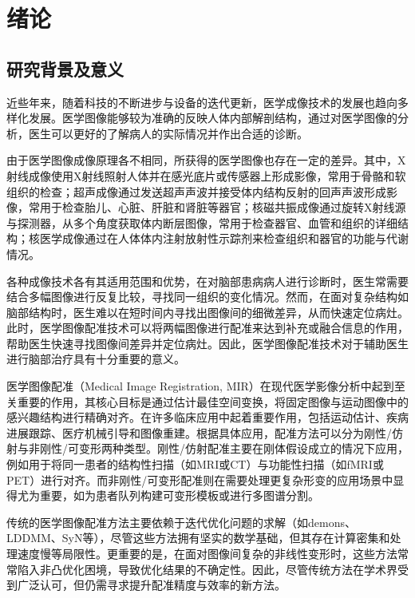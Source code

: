\chapter{绪\quad 论}

\section{研究背景及意义}

近些年来，随着科技的不断进步与设备的迭代更新，医学成像技术的发展也趋向多样化发展。医学图像能够较为准确的反映人体内部解剖结构，通过对医学图像的分析，医生可以更好的了解病人的实际情况并作出合适的诊断。

由于医学图像成像原理各不相同，所获得的医学图像也存在一定的差异。其中，X射线成像使用X射线照射人体并在感光底片或传感器上形成影像，常用于骨骼和软组织的检查；超声成像通过发送超声声波并接受体内结构反射的回声声波形成影像，常用于检查胎儿、心脏、肝脏和肾脏等器官；核磁共振成像通过旋转X射线源与探测器，从多个角度获取体内断层图像，常用于检查器官、血管和组织的详细结构；核医学成像通过在人体体内注射放射性示踪剂来检查组织和器官的功能与代谢情况。

各种成像技术各有其适用范围和优势，在对脑部患病病人进行诊断时，医生常需要结合多幅图像进行反复比较，寻找同一组织的变化情况。然而，在面对复杂结构如脑部结构时，医生难以在短时间内寻找出图像间的细微差异，从而快速定位病灶。此时，医学图像配准技术可以将两幅图像进行配准来达到补充或融合信息的作用，帮助医生快速寻找图像间差异并定位病灶。因此，医学图像配准技术对于辅助医生进行脑部治疗具有十分重要的意义。

医学图像配准（Medical Image Registration, MIR）在现代医学影像分析中起到至关重要的作用，其核心目标是通过估计最佳空间变换，将固定图像与运动图像中的感兴趣结构进行精确对齐。在许多临床应用中起着重要作用，包括运动估计、疾病进展跟踪、医疗机械引导和图像重建\cite{fuDeepLearningMedical2019}。根据具体应用，配准方法可以分为刚性/仿射与非刚性/可变形两种类型。刚性/仿射配准主要在刚体假设成立的情况下应用，例如用于将同一患者的结构性扫描（如MRI或CT）与功能性扫描（如fMRI或PET）进行对齐。而非刚性/可变形配准则在需要处理更复杂形变的应用场景中显得尤为重要，如为患者队列构建可变形模板\cite{ganser2004deformable}或进行多图谱分割\cite{cabezas2011review}。

传统的医学图像配准方法主要依赖于迭代优化问题的求解（如demons\cite{vercauteren2009diffeomorphic}、LDDMM\cite{beg2005computing}、SyN\cite{avants2008symmetric}等），尽管这些方法拥有坚实的数学基础，但其存在计算密集和处理速度慢等局限性。更重要的是，在面对图像间复杂的非线性变形时，这些方法常常陷入非凸优化困境，导致优化结果的不确定性。因此，尽管传统方法在学术界受到广泛认可，但仍需寻求提升配准精度与效率的新方法。

